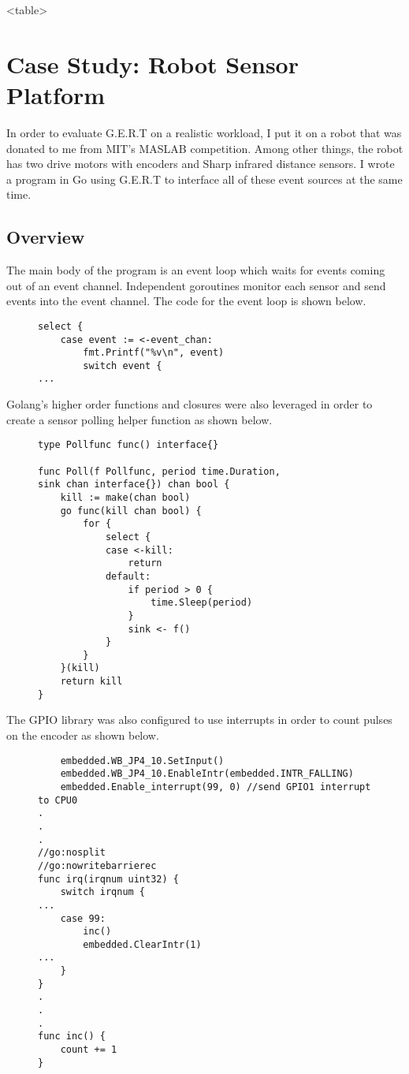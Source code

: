 <table>


\section{Case Study: Robot Sensor Platform}
In order to evaluate G.E.R.T on a realistic workload, I put it on a robot that was
donated to me from MIT's MASLAB competition. Among other things, the robot has two drive
motors with encoders and Sharp infrared distance sensors. I wrote a program in Go using
G.E.R.T to interface all of these event sources at the same time.

\subsection{Overview}
The main body of the program is an event loop which waits for events coming out of an event channel.
Independent goroutines monitor each sensor and send events into the event channel. The code for the
event loop is shown below.

\begin{figure}[h]
\begin{lstlisting}
select {
	case event := <-event_chan:
		fmt.Printf("%v\n", event)
		switch event {
...
\end{lstlisting}
\end{figure}

Golang's higher order functions and closures were also leveraged in order to create a sensor polling helper function
as shown below.

\begin{figure}[h]
\begin{lstlisting}
type Pollfunc func() interface{}

func Poll(f Pollfunc, period time.Duration,
sink chan interface{}) chan bool {
	kill := make(chan bool)
	go func(kill chan bool) {
		for {
			select {
			case <-kill:
				return
			default:
				if period > 0 {
					time.Sleep(period)
				}
				sink <- f()
			}
		}
	}(kill)
	return kill
}
\end{lstlisting}
\end{figure}

The GPIO library was also configured to use interrupts in order to count pulses on the encoder as shown below.

\begin{figure}[h]
\begin{lstlisting}
	embedded.WB_JP4_10.SetInput()
	embedded.WB_JP4_10.EnableIntr(embedded.INTR_FALLING)
	embedded.Enable_interrupt(99, 0) //send GPIO1 interrupt to CPU0
.
.
.
//go:nosplit
//go:nowritebarrierec
func irq(irqnum uint32) {
	switch irqnum {
...
	case 99:
		inc()
		embedded.ClearIntr(1)
...
	}
}
.
.
.
func inc() {
	count += 1
}

\end{lstlisting}
\end{figure}

